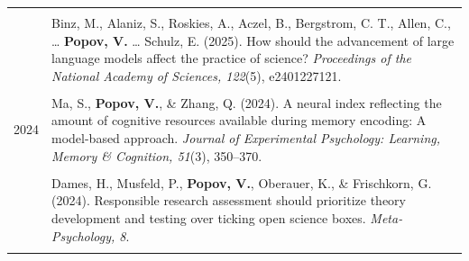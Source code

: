 \documentclass[letterpaper]{article}
\begin{document}
\begin{longtable}{p{0.7cm}p{15cm}}
  &                                                                                                                                                                                                                                                                                                                                          \\
  & Binz, M., Alaniz, S., Roskies, A., Aczel, B., Bergstrom, C. T., Allen, C., … \textbf{Popov, V.} … Schulz, E. (2025). How should the advancement of large language models affect the practice of science? {\it Proceedings of the National Academy of Sciences, 122}(5), e2401227121.                                                     \\[6pt]
  &                                                                                                                                                                                                                                                                                                                                          \\
  2024 & Ma, S., \textbf{Popov, V.}, \& Zhang, Q. (2024). A neural index reflecting the amount of cognitive resources available during memory encoding: A model-based approach. {\it Journal of Experimental Psychology: Learning, Memory \& Cognition, 51}(3), 350--370.                                                                         \\[6pt]
  &                                                                                                                                                                                                                                                                                                                                          \\
  & Dames, H., Musfeld, P., \textbf{Popov, V.}, Oberauer, K., \& Frischkorn, G. (2024). Responsible research assessment should prioritize theory development and testing over ticking open science boxes. {\it Meta-Psychology, 8}.                                                                                                          \\[6pt]
  &                                                                                                                                                                                                                                                                                                                                          \\

\end{longtable}
\end{document}
